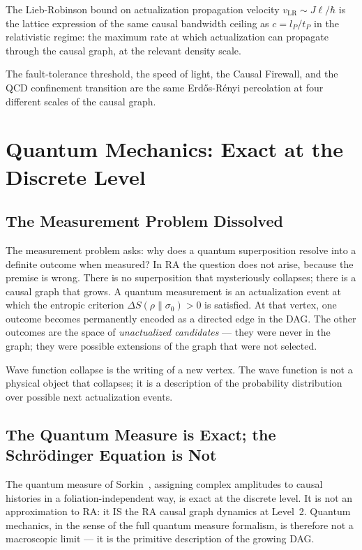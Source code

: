 \documentclass[11pt,a4paper]{article}
\begin{document}
The Lieb-Robinson bound on actualization propagation velocity
$v_{\mathrm{LR}} \sim J\ell/\hbar$ is the lattice expression of the
same causal bandwidth ceiling as $c = l_P/t_P$ in the relativistic
regime: the maximum rate at which actualization can propagate through
the causal graph, at the relevant density scale.

The fault-tolerance threshold, the speed of light, the Causal Firewall,
and the QCD confinement transition are the same Erd\H{o}s-R\'{e}nyi
percolation at four different scales of the causal graph.

\section{Quantum Mechanics: Exact at the Discrete Level}
\label{sec:QM}

\subsection{The Measurement Problem Dissolved}

The measurement problem asks: why does a quantum superposition resolve
into a definite outcome when measured? In RA the question does not arise,
because the premise is wrong. There is no superposition that mysteriously
collapses; there is a causal graph that grows. A quantum measurement is an
actualization event at which the entropic criterion $\Delta S(\rho\|\sigma_0)
> 0$ is satisfied. At that vertex, one outcome becomes permanently encoded
as a directed edge in the DAG. The other outcomes are the space of
\emph{unactualized candidates} --- they were never in the graph; they were
possible extensions of the graph that were not selected.

Wave function collapse is the writing of a new vertex. The wave function
is not a physical object that collapses; it is a description of the
probability distribution over possible next actualization events.

\subsection{The Quantum Measure is Exact; the Schr\"{o}dinger Equation is Not}

The quantum measure of Sorkin~\citep{Sorkin1994}, assigning complex
amplitudes to causal histories in a foliation-independent way, is exact
at the discrete level. It is not an approximation to RA: it IS the RA
causal graph dynamics at Level~2. Quantum mechanics, in the sense of the
full quantum measure formalism, is therefore not a macroscopic limit ---
it is the primitive description of the growing DAG.
\end{document}

